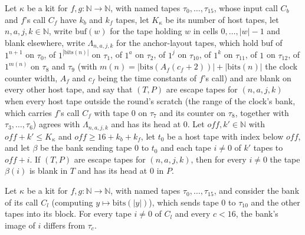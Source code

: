 \begin{theorem}
\label{Turing.NTimeDiag.QyEscT.bank}
\leanok
{}
Let $\kappa$ be a kit for $f, g : \mathbb{N} \to \mathbb{N}$, with named tapes $\tau_0, \dots,
\tau_{15}$, whose input call $C_b$ and $f$'s call $C_f$ have $k_b$ and $k_f$ tapes, let $K_\kappa$
be its number of host tapes, let $n, a, j, k \in \mathbb{N}$, write $\mathrm{buf}(w)$ for the tape
holding $w$ in cells $0, \dots, |w| - 1$ and blank elsewhere, write $\Lambda_{n,a,j,k}$ for the
anchor-layout tapes, which hold $\mathrm{buf}$ of $1^{n+1}$ on $\tau_0$, of
$1^{|\mathrm{bits}(n)|}$ on $\tau_1$, of $1^a$ on $\tau_2$, of $1^j$ on $\tau_{10}$, of $1^k$ on
$\tau_{11}$, of $1$ on $\tau_{12}$, of $1^{m(n)}$ on $\tau_8$ and $\tau_9$ (with $m(n) =
|\mathrm{bits}(A_f(c_f + 2))| + |\mathrm{bits}(n)|$ the clock counter width, $A_f$ and $c_f$ being
the time constants of $f$'s call) and are blank on every other host tape, and say that $(T, P)$ are
escape tapes for $(n, a, j, k)$ when every host tape outside the round's scratch (the range of the
clock's bank, which carries $f$'s call $C_f$ with tape $0$ on $\tau_7$ and its counter on $\tau_8$,
together with $\tau_3, \dots, \tau_6$) agrees with $\Lambda_{n,a,j,k}$ and has its head at $0$. Let
$\mathit{off}, k' \in \mathbb{N}$ with $\mathit{off} + k' \le K_\kappa$ and $\mathit{off} \ge 16 +
k_b + k_f$, let $t_0$ be a host tape with index below $\mathit{off}$, and let $\beta$ be the bank
sending tape $0$ to $t_0$ and each tape $i \ne 0$ of $k'$ tapes to $\mathit{off} + i$. If $(T, P)$
are escape tapes for $(n, a, j, k)$, then for every $i \ne 0$ the tape $\beta(i)$ is blank in $T$
and has its head at $0$ in $P$.
\end{theorem}

\begin{theorem}
\label{Turing.NTimeDiag.QyKit.bCl_ne}
\leanok
{}
Let $\kappa$ be a kit for $f, g : \mathbb{N} \to \mathbb{N}$, with named tapes $\tau_0, \dots,
\tau_{15}$, and consider the bank of its call $C_l$ (computing $y \mapsto \mathrm{bits}(|y|)$),
which sends tape $0$ to $\tau_{10}$ and the other tapes into its block. For every tape $i \ne 0$ of
$C_l$ and every $c < 16$, the bank's image of $i$ differs from $\tau_c$.
\end{theorem}

